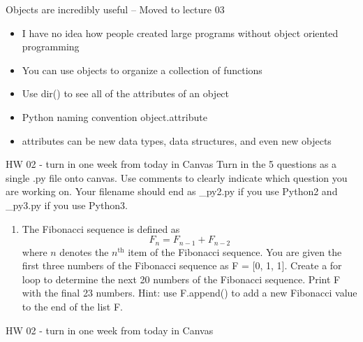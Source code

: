 \documentclass[10pt]{beamer}
\begin{document}
\begin{frame}[fragile]{Objects are incredibly useful -- Moved to lecture 03}
\begin{itemize}
\item I have no idea how people created large programs without object oriented programming
\item You can use objects to organize a collection of functions 
\item Use dir() to see all of the attributes of an object
\item Python naming convention object.attribute
\item attributes can be new data types, data structures, and even new objects
\end{itemize}
\end{frame}

\begin{frame}[fragile]{HW 02 - turn in one week from today in Canvas}
Turn in the 5 questions as a single .py file onto canvas. Use comments to clearly indicate which question you are working on. Your filename should end as \_py2.py if you use Python2 and \_py3.py if you use Python3.
\begin{enumerate}
\item The Fibonacci sequence is defined as
\begin{equation}
F_n = F_{n-1} + F_{n-2}
\end{equation}
where $n$ denotes the $n^\text{th}$ item of the Fibonacci sequence. You are given the first three numbers of the Fibonacci sequence as F = [0, 1, 1]. Create a for loop to determine the next 20 numbers of the Fibonacci sequence. Print F with the final 23 numbers. Hint: use F.append() to add a new Fibonacci value to the end of the list F.
\end{enumerate}

\end{frame}

\begin{frame}[fragile]{HW 02 - turn in one week from today in Canvas}
\end{frame}
\end{document}
